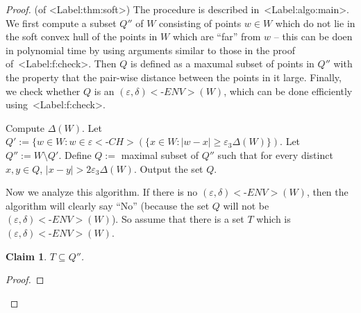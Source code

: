 \documentclass[11pt,letterpaper]{article}
\def\mathsf#1{<#1>}%
\def\Cref#1{<Label:#1>}%
\newtheorem{claim}[theorem]{Claim}
\theoremstyle{definition}
\theoremstyle{remark}
\newcommand{\dia}{\Delta}
\newcommand{\edenv}{{(\varepsilon, \delta){{\mathsf{\mbox{-}ENV}}}}}
\newcommand{\ech}{{\varepsilon{{\mathsf{\mbox{-}CH}}}}}
\begin{document}
\begin{proof} (of \Cref{thm:soft})
The procedure is described  in~\Cref{algo:main}. We first compute a subset $Q''$ of $W$ consisting of points $w \in W$ which do not lie in the soft convex hull of the points in $W$ which are ``far'' from $w$ -- this can be doen in polynomial time by using arguments similar to those in the proof of~\Cref{f:check}. Then $Q$ is defined as a maxumal subset of points in $Q''$ with the property that the pair-wise distance between the points in it large. Finally, we check whether $Q$ is an $\edenv(W)$, which can be done efficiently using~\Cref{f:check}. 


\begin{algorithm}[H]
  \caption{Procedure to identify $\edenv(W)$}
  \label{algo:main}
    Compute $\dia(W)$. \;
    Let $Q' := \{w \in W: w \in \ech \left(\{x \in W: |w-x| \geq \varepsilon_3 \dia(W) \}\right). $ \;
    Let $Q'' := W \setminus Q'$. \;
    Define $Q :=$ maximal subset of $Q''$ such that for every distinct $x,y \in Q$, $|x-y| > 2\varepsilon_3 \dia(W). $ \;
    \If{$Q$ is $\edenv(W)$} {
       Output  the set $Q$. \; }
\end{algorithm}


Now we analyze this algorithm. If there is no $\edenv(W)$, then the algorithm will clearly say ``No'' (because the set $Q$ will not be $\edenv(W)$). So assume that there is a set $T$ which is $\edenv(W)$. 

\begin{claim}
\label{cl:ed}
$T \subseteq Q''$. 
\end{claim}
\begin{proof}


\end{proof}
\end{proof}
\end{document}

